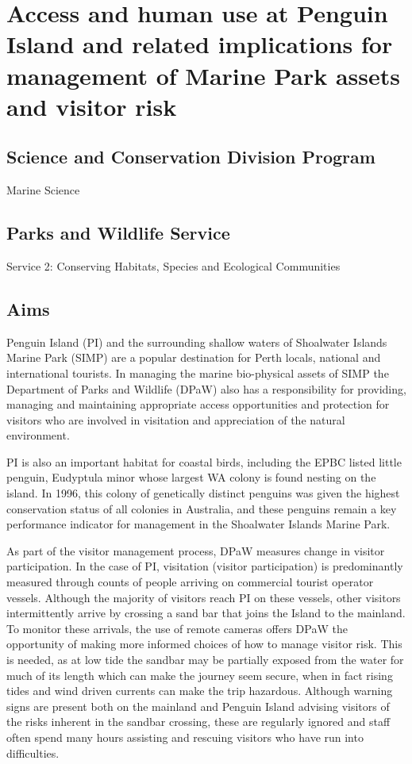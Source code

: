 \documentclass[version=last,
    paper=a4,                               %
    10pt,                                   %
    dvipsnames,
    oneside,                              %
    headings=openany,                       %
    open=any,
    BCOR=7mm,                               %
    DIV=15,     %
]{scrbook}
\begin{document}
\section*{Access and human use at Penguin Island and related implications for
management of Marine Park assets and visitor risk
}



\subsection*{Science and Conservation Division Program}

Marine Science




\subsection*{Parks and Wildlife Service}

Service 2: Conserving Habitats, Species and Ecological Communities




\subsection*{Aims}

Penguin Island (PI) and the surrounding shallow waters of Shoalwater
Islands Marine Park (SIMP) are a popular destination for Perth locals,
national and international tourists. In managing the marine bio-physical
assets of SIMP the Department of Parks and Wildlife (DPaW) also has a
responsibility for providing, managing and maintaining appropriate
access opportunities and protection for visitors who are involved in
visitation and appreciation of the natural environment.

PI is also an important habitat for coastal birds, including the EPBC
listed little penguin, Eudyptula minor whose largest WA colony is found
nesting on the island. In 1996, this colony of genetically distinct
penguins was given the highest conservation status of all colonies in
Australia, and these penguins remain a key performance indicator for
management in the Shoalwater Islands Marine Park.

As part of the visitor management process, DPaW measures change in
visitor participation. In the case of PI, visitation (visitor
participation) is predominantly measured through counts of people
arriving on commercial tourist operator vessels. Although the majority
of visitors reach PI on these vessels, other visitors intermittently
arrive by crossing a sand bar that joins the Island to the mainland. To
monitor these arrivals, the use of remote cameras offers DPaW the
opportunity of making more informed choices of how to manage visitor
risk. This is needed, as at low tide the sandbar may be partially
exposed from the water for much of its length which can make the journey
seem secure, when in fact rising tides and wind driven currents can make
the trip hazardous. Although warning signs are present both on the
mainland and Penguin Island advising visitors of the risks inherent in
the sandbar crossing, these are regularly ignored and staff often spend
many hours assisting and rescuing visitors who have run into
difficulties.
\end{document}
